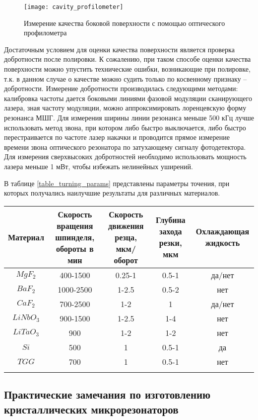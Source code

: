\begin{figure}[ht]
  \texttt{[image: cavity\_profilometer]}
  \caption{Измерение качества боковой поверхности с помощью оптического профилометра}
  \label{cavity_profilometer}
\end{figure}

Достаточным условием для оценки качества поверхности является проверка добротности после полировки. К сожалению, при таком способе оценки качества поверхности можно упустить технические ошибки, возникающие при полировке, т.к. в данном случае о качестве можно судить только по косвенному признаку – добротности. Измерение добротности производилась следующими методами: калибровка частоты дается боковыми линиями фазовой модуляции сканирующего лазера, зная частоту модуляции, можно аппроксимировать лоренцевскую форму резонанса МШГ. Для измерения ширины линии резонанса меньше 500 кГц лучше использовать метод звона, при котором либо быстро выключается, либо быстро перестраивается по частоте лазер накачки и проводится прямое измерение времени звона оптического резонатора по затухающему сигналу фотодетектора. Для измерения сверхвысоких добротностей необходимо использовать мощность лазера меньше 1 мВт, чтобы избежать нелинейных уширений.

В таблице \ref{table_turning_params} представлены параметры точения, при которых получались наилучшие результаты для различных материалов. 
\begin{tabular}{||c|c|c|c|c||}
\hline
Материал & Скорость вращения шпинделя, обороты в мин & Скорость движения резца, мкм/оборот & Глубина захода резки, мкм & Охлаждающая жидкость\\
\hline
$MgF_2$ & 400-1500 & 0.25-1 & 0.5-1 & да/нет \\
\hline
$BaF_2$ & 1000-2500 & 1-2.5 & 0.5-2 & нет \\
\hline
$CaF_2$ & 700-2500 & 1-2 & 1 & да/нет \\
\hline
$LiNbO_3$ & 900-1500 & 1-2.5 & 1-4 & нет \\
\hline
$LiTaO_3$ & 900 & 1-2 & 1-2 & нет \\
\hline
$Si$ & 500 & 1 & 0.5-1 & да \\
\hline
$TGG$ & 700 & 1 & 0.5-1 & нет \\
\hline
\label{table_turning_params}
\end{tabular}

\subsection{Практические замечания по изготовлению кристаллических микрорезонаторов}

